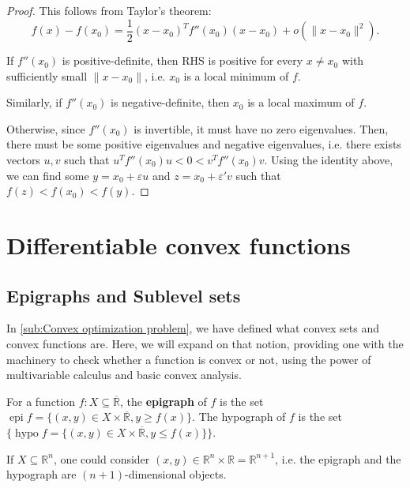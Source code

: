 \begin{proof}
  This follows from Taylor's theorem:
  \[
    f(x) - f(x_{0}) = \frac{1}{2} (x-x_{0})^{T}f''(x_{0})(x-x_{0}) +
    o(\|x-x_{0}\|^2)
  .\] 

  If \( f''(x_{0}) \) is positive-definite, then RHS is positive for every \( x
  \neq x_{0}\) with sufficiently small \( \|x-x_{0}\| \), i.e. \( x_{0} \) is a
  local minimum of \( f \).

  Similarly, if \( f''(x_{0}) \) is negative-definite, then \( x_{0} \) is a
  local maximum of \( f \).

  Otherwise, since \( f''(x_{0}) \) is invertible, it must have no zero
  eigenvalues. Then, there must be some positive eigenvalues and negative
  eigenvalues, i.e. there exists vectors \( u, v \) such that \( u^{T}f''(x_{0})u <  0
  < v^{T}f''(x_{0})v\). Using the identity above, we can find some \( y = x_{0}
  + \varepsilon u\) and \( z = x_{0} + \varepsilon' v \) such that \( f(z) <
  f(x_{0}) < f(y) \).
\end{proof}



\section{Differentiable convex functions} %
\label{sec:Differentiable convex functions}

\subsection{Epigraphs and Sublevel sets} %
\label{sub:Epigraphs and Sublevel sets}

In \ref{sub:Convex optimization problem}, we have defined what convex sets and
convex functions are. Here, we will expand on that notion, providing one with
the machinery to check whether a function is convex or not, using the power of
multivariable calculus and basic convex analysis.

\begin{definition}
\label{def:Epigraphs and Hypographs}
  For a function \( f: X \subseteq \overline{\mathbb{R}}  \), the
  \textbf{epigraph} of \( f \) is the set \( \operatorname{epi} f = \{(x, y) \in
  X \times  \overline{\mathbb{R}}, y \ge f(x) \}    \). The hypograph of \( f \)
  is the set \( \{\operatorname{hypo} f = \{(x, y) \in X \times
  \overline{\mathbb{R}}, y \le f(x) \}  \}   \).

  If \( X \subseteq \mathbb{R}^{n} \), one could consider \( (x, y) \in
  \mathbb{R}^{n} \times  \mathbb{R} = \mathbb{R}^{n+1} \), i.e. the epigraph and
  the hypograph are \( (n+1) \)-dimensional objects.
\end{definition}

